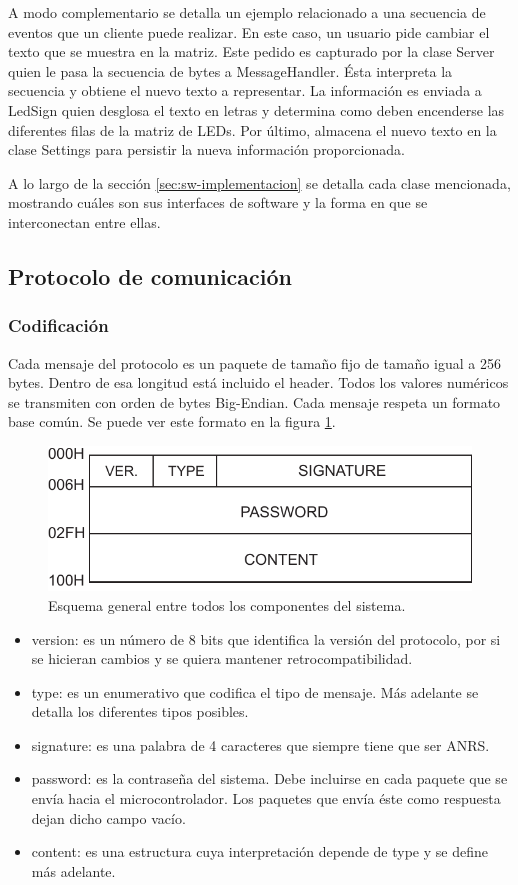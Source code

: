 A modo complementario se detalla un ejemplo relacionado a una secuencia de eventos que un cliente puede realizar.
En este caso, un usuario pide cambiar el texto que se muestra en la matriz. Este pedido es capturado por la clase Server quien le pasa la secuencia de bytes a MessageHandler.
Ésta interpreta la secuencia y obtiene el nuevo texto a representar. La información es enviada a LedSign quien desglosa el texto en letras y determina como deben encenderse las diferentes filas de la matriz de LEDs.
Por último, almacena el nuevo texto en la clase Settings para persistir la nueva información proporcionada.

A lo largo de la sección \ref{sec:sw-implementacion} se detalla cada clase mencionada, mostrando cuáles son sus interfaces de software y la forma en que se interconectan entre ellas.

\subsection{Protocolo de comunicación} \label{sec:protocolo}

\subsubsection{Codificación}

Cada mensaje del protocolo es un paquete de tamaño fijo de tamaño igual a 256 bytes.
Dentro de esa longitud está incluido el header.
Todos los valores numéricos se transmiten con orden de bytes Big-Endian.
Cada mensaje respeta un formato base común. Se puede ver este formato en la figura \ref{fig:paquete-base}.


\begin{figure}[!ht]
	\centering
	\includegraphics[width=0.6\linewidth]{imagenes/protocolo/paquete-base.pdf}
	\caption{Esquema general entre todos los componentes del sistema.}
	\label{fig:paquete-base}
\end{figure}

\begin{itemize}
	\item version: es un número de 8 bits que identifica la versión del protocolo, por si se hicieran cambios y se quiera mantener retrocompatibilidad.
	\item type: es un enumerativo que codifica el tipo de mensaje. Más adelante se detalla los diferentes tipos posibles.
	\item signature: es una palabra de 4 caracteres que siempre tiene que ser ANRS.
	\item password: es la contraseña del sistema. Debe incluirse en cada paquete que se envía hacia el microcontrolador. Los paquetes que envía éste como respuesta dejan dicho campo vacío.
	\item content: es una estructura cuya interpretación depende de type y se define más adelante.
\end{itemize}



